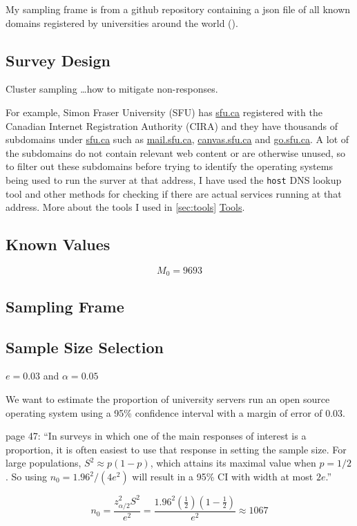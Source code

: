 \documentclass{article}
\theoremstyle{definition}
\begin{document}
\begin{flushleft}
My sampling frame is from a github repository containing
a json file of all known domains registered by
universities around the world (\cite{Hipo}).

\subsection{Survey Design}
Cluster sampling \dots how to mitigate non-responses.

For example, Simon Fraser University (SFU) has \url{sfu.ca} registered with
the Canadian Internet Registration Authority (CIRA) and
they have thousands of subdomains under \url{sfu.ca} such as \url{mail.sfu.ca},
\url{canvas.sfu.ca} and \url{go.sfu.ca}. A lot of the subdomains do not
contain relevant web content or are otherwise unused, so to filter out these
subdomains before trying to identify the operating systems being
used to run the surver at that address, I have used the \texttt{host} DNS
lookup tool and other methods for checking if there are actual services running
at that address. More about the tools I used in \autoref{sec:tools} \hyperref[sec:tools]{Tools}.

\subsection{Known Values}
$$
	M_0=9693
$$

\subsection{Sampling Frame}


\subsection{Sample Size Selection}
$e=0.03$ and $\alpha=0.05$ \cite{lohr2019}

We want to estimate the proportion of university servers
run an open source operating system using a 95\% confidence
interval with a margin of error of 0.03.

\cite{lohr2019} page 47:
``In surveys in which one of the main responses of interest
is a proportion, it is often easiest to use that response
in setting the sample size.
For large populations, $S^2 \approx p(1-p)$, which
attains its maximal value when $p=1/2$. So using
$n_0=1.96^2/(4e^2)$ will result in a 95\% CI with width at most
$2e$.''

$$
	n_0
	=
	\frac{
		z^2_{\alpha/2}S^2
	}{
		e^2
	}
	=
	\frac{
		1.96^2(\frac{1}{2})(1-\frac{1}{2})
	}{
		e^2
	}
	\approx
	1067
$$


\end{flushleft}
\end{document}
